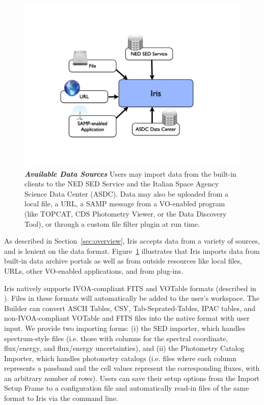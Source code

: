\documentclass[final,5p]{elsarticle}
\begin{document}
\begin{figure}
\begin{center}
\includegraphics[width=\columnwidth]{figures/IrisDiagrams.002.png}
\caption{\textit{\textbf{\label{fig:data_sources} Available Data Sources}}\textit{}\textbf{}\textit{} Users may import data from the built-in clients to the NED SED Service and the Italian Space Agency Science Data Center (ASDC). Data may also be uploaded from a local file, a URL, a SAMP message from a VO-enabled program (like TOPCAT, CDS Photometry Viewer, or the Data Discovery Tool), or through a custom file filter plugin at run time.}
\end{center}
\end{figure}

As described in Section~\ref{sec:overview}, Iris accepts data from a variety of sources, and is lenient on the data format. Figure~\ref{fig:data_sources} illustrates that Iris imports data from built-in data archive portals as well as from outside resources like local files, URLs, other VO-enabled applications, and from plug-ins.

Iris natively supports IVOA-compliant FITS and VOTable formats (described in \cite{2012arXiv1204.3055M}). Files in these formats will automatically be added to the user's workspace. The Builder can convert ASCII Tables, CSV, Tab-Seprated-Tables, IPAC tables, and non-IVOA-compliant VOTable and FITS files into the native format with user input. We provide two importing forms: (i) the SED importer, which handles spectrum-style files (i.e. those with columns for the spectral coordinate, flux/energy, and flux/energy uncertainties), and (ii) the Photometry Catalog Importer, which handles photometry catalogs (i.e. files where each column represents a passband and the cell values represent the corresponding fluxes, with an arbitrary number of rows). Users can save their setup options from the Import Setup Frame to a configuration file and automatically read-in files of the same format to Iris via the command line.
\end{document}
